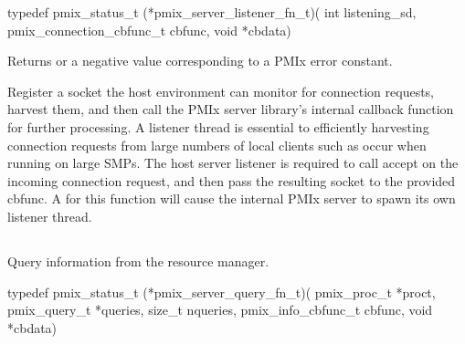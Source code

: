 \format

\cspecificstart
\begin{codepar}
typedef pmix_status_t (*pmix_server_listener_fn_t)(
                             int listening_sd,
                             pmix_connection_cbfunc_t cbfunc,
                             void *cbdata)
\end{codepar}
\cspecificend

\begin{arglist}
\end{arglist}

Returns  or a negative value corresponding to a PMIx error constant.

\descr

Register a socket the host environment can monitor for connection requests, harvest them, and then call the \ac{PMIx} server library's internal callback function for further processing.
A listener thread is essential to efficiently harvesting connection requests from large numbers of local clients such as occur when running on large SMPs.
The host server listener is required to call accept on the incoming connection request, and then pass the resulting socket to the provided cbfunc.
A  for this function will cause the internal \ac{PMIx} server to spawn its own listener thread.


\subsection{}

\summary

Query information from the resource manager.

\format

\cspecificstart
\begin{codepar}
typedef pmix_status_t (*pmix_server_query_fn_t)(
                             pmix_proc_t *proct,
                             pmix_query_t *queries, size_t nqueries,
                             pmix_info_cbfunc_t cbfunc,
                             void *cbdata)
\end{codepar}
\cspecificend

\begin{arglist}
\end{arglist}

